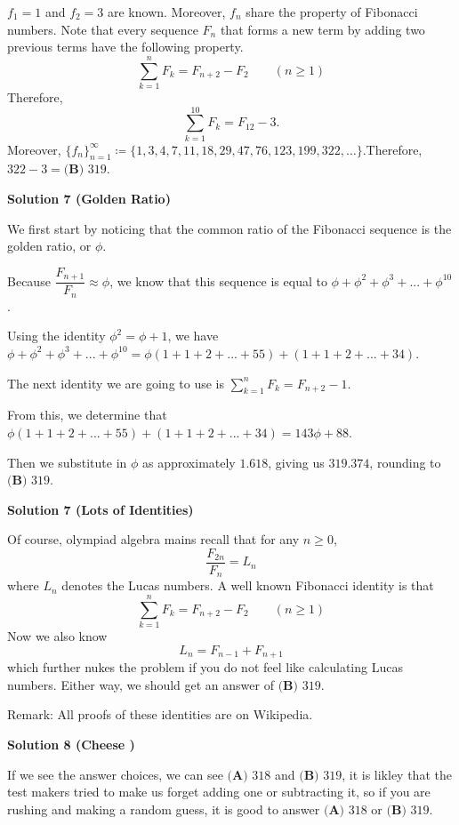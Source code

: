 \begin{enumerate}
 
$f_1 = 1$ and $f_2 = 3$ are known. Moreover, $f_n$ share the property of Fibonacci numbers. Note that every sequence $F_n$ that forms a new term by adding two previous terms have the following property.
 \[\sum_{k=1}^{n} F_k = F_{n+2} - F_2 \qquad (n \geq 1)\]Therefore,
 \[\sum_{k=1}^{10} F_k = F_{12} - 3.\]Moreover, $\{f_n\}_{n=1}^\infty \coloneq \{ 1, 3, 4, 7, 11, 18, 29, 47, 76, 123, 199, 322, \dots \}$.Therefore, $322 - 3 = \boxed{\textbf{(B) }319}$.

 



\textbf{Solution 7 (Golden Ratio)}

We first start by noticing that the common ratio of the Fibonacci sequence is the golden ratio, or $\phi$.

 Because $\dfrac{F_{n+1}}{F_{n}}\approx\phi$, we know that this sequence is equal to $\phi+\phi^{2}+\phi^{3}+...+\phi^{10}$.

 Using the identity $\phi^2=\phi+1$, we have $\phi+\phi^{2}+\phi^{3}+...+\phi^{10}=\phi\left(1+1+2+...+55\right)+\left(1+1+2+...+34\right)$.

 The next identity we are going to use is $\sum_{k=1}^{n} F_k = F_{n+2}-1$.

 From this, we determine that $\phi\left(1+1+2+...+55\right)+\left(1+1+2+...+34\right)=143\phi+88$.

 Then we substitute in $\phi$ as approximately $1.618$, giving us $319.374$, rounding to $\boxed{\textbf{(B) }319}$.

 



\textbf{Solution 7 (Lots of Identities)}

Of course, olympiad algebra mains recall that for any $n\ge0$, 
 \[\frac{F_{2n}}{F_{n}} = L_{n}\] where $L_{n}$ denotes the Lucas numbers. A well known Fibonacci identity is that
 \[\sum_{k=1}^{n} F_k = F_{n+2} - F_2 \qquad (n \geq 1)\]Now we also know 
 \[L_{n} = F_{n-1}+F_{n+1}\] which further nukes the problem if you do not feel like calculating Lucas numbers. Either way, we should get an answer of $\boxed{\textbf{(B) }319}$.

 Remark: All proofs of these identities are on Wikipedia.

 



\textbf{Solution 8 (Cheese )}

If we see the answer choices, we can see $\boxed{\textbf{(A) }318}$ and $\boxed{\textbf{(B) }319}$, it is likley that the test makers tried to make us forget adding one or subtracting it, so if you are rushing and making a random guess, it is good to answer $\boxed{\textbf{(A) }318}$ or $\boxed{\textbf{(B) }319}$. 


\end{enumerate}
